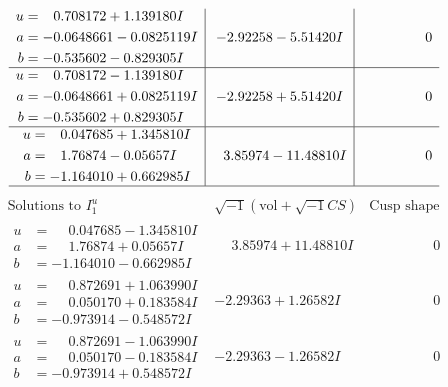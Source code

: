 \documentclass[1p]{elsarticle_modified}
\theoremstyle{definition}
\newcommand{\I}{\sqrt{-1}}
\begin{document}
$$\begin{array}{c|c|c}
\begin{aligned}
u &= \phantom{-}0.708172 + 1.139180 I \\
a &= -0.0648661 - 0.0825119 I \\
b &= -0.535602 - 0.829305 I\end{aligned}
 & -2.92258 - 5.51420 I & \phantom{-0.000000 } 0 \\ \hline\begin{aligned}
u &= \phantom{-}0.708172 - 1.139180 I \\
a &= -0.0648661 + 0.0825119 I \\
b &= -0.535602 + 0.829305 I\end{aligned}
 & -2.92258 + 5.51420 I & \phantom{-0.000000 } 0 \\ \hline\begin{aligned}
u &= \phantom{-}0.047685 + 1.345810 I \\
a &= \phantom{-}1.76874 - 0.05657 I \\
b &= -1.164010 + 0.662985 I\end{aligned}
 & \phantom{-}3.85974 - 11.48810 I & \phantom{-0.000000 } 0\\
 \hline 
 \end{array}$$\newpage$$\begin{array}{c|c|c}  
\text{Solutions to }I^u_{1}& \I (\text{vol} + \sqrt{-1}CS) & \text{Cusp shape}\\
 \hline 
\begin{aligned}
u &= \phantom{-}0.047685 - 1.345810 I \\
a &= \phantom{-}1.76874 + 0.05657 I \\
b &= -1.164010 - 0.662985 I\end{aligned}
 & \phantom{-}3.85974 + 11.48810 I & \phantom{-0.000000 } 0 \\ \hline\begin{aligned}
u &= \phantom{-}0.872691 + 1.063990 I \\
a &= \phantom{-}0.050170 + 0.183584 I \\
b &= -0.973914 - 0.548572 I\end{aligned}
 & -2.29363 + 1.26582 I & \phantom{-0.000000 } 0 \\ \hline\begin{aligned}
u &= \phantom{-}0.872691 - 1.063990 I \\
a &= \phantom{-}0.050170 - 0.183584 I \\
b &= -0.973914 + 0.548572 I\end{aligned}
 & -2.29363 - 1.26582 I & \phantom{-0.000000 } 0 \\ \hline\begin{aligned}

\end{aligned}
\end{array}$$
\end{document}

